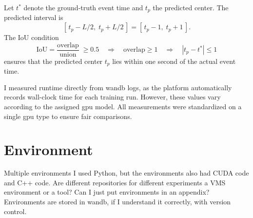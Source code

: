 Let $t^*$ denote the ground‐truth event time and $t_p$ the predicted center. The predicted interval is
\[
    [\,t_p - L/2,\;t_p + L/2\,]
    = [\,t_p - 1,\;t_p + 1\,].
\] 
The IoU condition
\[
    \mathrm{IoU}
    = \frac{\text{overlap}}{\text{union}}
    \;\ge0.5
    \quad\Longrightarrow\quad
    \text{overlap}\ge1
    \quad\Longrightarrow\quad
    |t_p - t^*|\le1
\]
ensures that the predicted center $t_p$ lies within one second of the actual event time.

I measured runtime directly from \acrshort{wandb} logs, as the platform automatically records wall-clock time for each training run. However, these values vary according to the assigned \acrshort{gpu} model. All measurements were standardized on a single \acrshort{gpu} type to ensure fair comparisons. 

\section{Environment} \todo 

Multiple environments
I used Python, but the environments also had CUDA code and C++ code. 
Are different repositories for different experiments
a VMS environment or a tool?
Can I just put environments in an appendix? Environments are stored in wandb, if I understand it correctly, with version control.